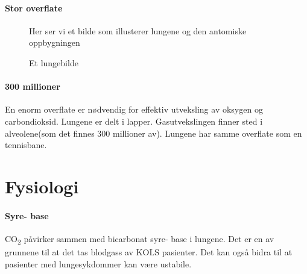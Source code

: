 			\paragraph{Stor overflate\\}
				\begin{figure}[ht]
                      \centering
                      \caption{Et lungebilde}
                      {Her ser vi et bilde som illusterer lungene og den antomiske oppbygningen}%
                    \end{figure}
            \paragraph{300 millioner\\}
            	En enorm overflate er nødvendig for effektiv utveksling av oksygen og carbondioksid. Lungene er delt i lapper. Gasutvekslingen finner sted i alveolene(som det finnes 300 millioner av). Lungene har samme overflate som en tennisbane.
		\section{Fysiologi}
				\paragraph{Syre- base\\}
					CO\textsubscript{2} påvirker sammen med bicarbonat syre- base i lungene. Det er en av grunnene til at det tas blodgass av KOLS pasienter. Det kan også bidra til at pasienter med lungesykdommer kan være ustabile.
